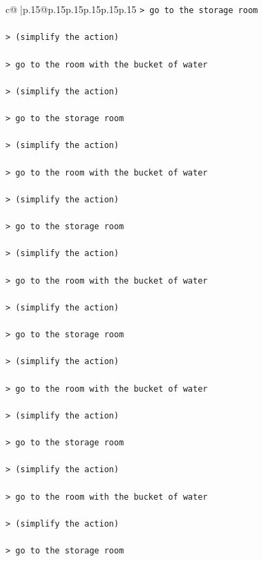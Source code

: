 \documentclass{article}
\begin{document}
{\begin{supertabular}{c@{$\;$}|p{.15\linewidth}@{}p{.15\linewidth}p{.15\linewidth}p{.15\linewidth}p{.15\linewidth}p{.15\linewidth}}
{{{\texttt{> go to the storage room } \\
\\ 
\texttt{> (simplify the action) } \\
\\ 
\texttt{> go to the room with the bucket of water } \\
\\ 
\texttt{> (simplify the action) } \\
\\ 
\texttt{> go to the storage room } \\
\\ 
\texttt{> (simplify the action) } \\
\\ 
\texttt{> go to the room with the bucket of water } \\
\\ 
\texttt{> (simplify the action) } \\
\\ 
\texttt{> go to the storage room } \\
\\ 
\texttt{> (simplify the action) } \\
\\ 
\texttt{> go to the room with the bucket of water } \\
\\ 
\texttt{> (simplify the action) } \\
\\ 
\texttt{> go to the storage room } \\
\\ 
\texttt{> (simplify the action) } \\
\\ 
\texttt{> go to the room with the bucket of water } \\
\\ 
\texttt{> (simplify the action) } \\
\\ 
\texttt{> go to the storage room } \\
\\ 
\texttt{> (simplify the action) } \\
\\ 
\texttt{> go to the room with the bucket of water } \\
\\ 
\texttt{> (simplify the action) } \\
\\ 
\texttt{> go to the storage room } \\
\\ 
}}}
\end{supertabular}}
\end{document}

